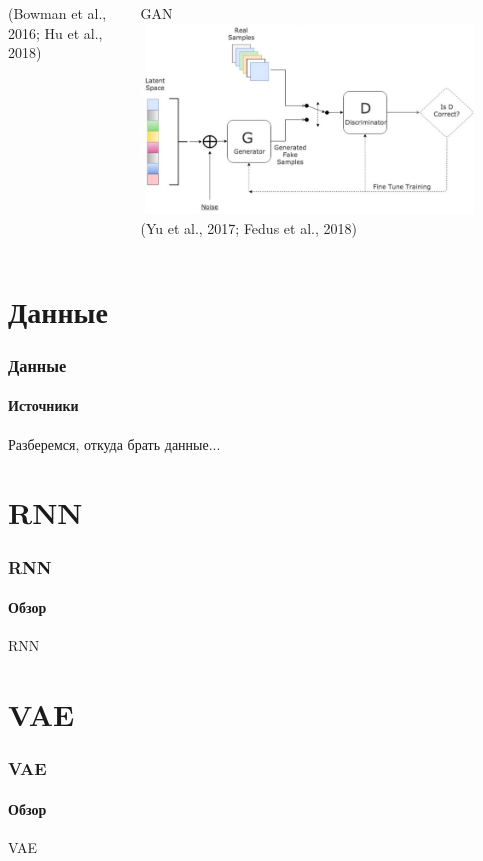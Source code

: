 \documentclass[10pt]{beamer}
\begin{document}
\begin{frame}
\begin{columns}[T]
\begin{column}[T]{0.33\textwidth}
\begin{center}
            (Bowman et al., 2016; Hu et al., 2018)
        \end{center}
    \end{column}
    \vline
    \begin{column}[T]{0.33\textwidth}
        \begin{center}
            GAN \\
            \includegraphics[width=0.9\textwidth]{images/gan.png} \\
            (Yu et al., 2017; Fedus et al., 2018)
        \end{center}
    \end{column}
\end{columns}

\end{frame}
\section{Данные}
\begin{frame}
\frametitle{Данные}
\framesubtitle{Источники}

Разберемся, откуда брать данные...

\end{frame}
\section{RNN}
\begin{frame}
\frametitle{RNN}
\framesubtitle{Обзор}

RNN

\end{frame}
\section{VAE}
\begin{frame}
\frametitle{VAE}
\framesubtitle{Обзор}

VAE

\end{frame}
\end{document}
